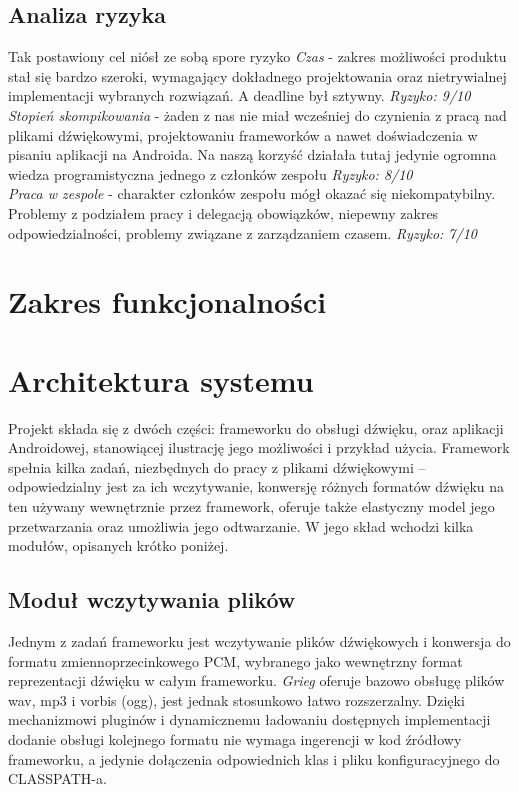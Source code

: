 \section{Analiza ryzyka}
Tak postawiony cel niósł ze sobą spore ryzyko
\emph{Czas} - zakres możliwości produktu stał się bardzo szeroki, wymagający dokładnego projektowania oraz nietrywialnej implementacji wybranych rozwiązań. A deadline był sztywny. \emph{Ryzyko: 9/10}
\\
\emph{Stopień skompikowania} - żaden z nas nie miał wcześniej do czynienia z pracą nad plikami dźwiękowymi, projektowaniu frameworków a nawet doświadczenia w pisaniu aplikacji na Androida. Na naszą korzyść działała tutaj jedynie ogromna wiedza programistyczna jednego z członków zespołu \emph{Ryzyko: 8/10}
\\
\emph{Praca w zespole} - charakter członków zespołu mógł okazać się niekompatybilny. Problemy z podziałem pracy i delegacją obowiązków, niepewny zakres odpowiedzialności, problemy związane z zarządzaniem czasem. \emph{Ryzyko: 7/10} 
 
\chapter{Zakres funkcjonalności}


\chapter{Architektura systemu}

Projekt składa się z dwóch części: frameworku do obsługi dźwięku, oraz aplikacji Androidowej,
stanowiącej ilustrację jego możliwości i przykład użycia. Framework spełnia kilka zadań, niezbędnych
do pracy z plikami dźwiękowymi -- odpowiedzialny jest za ich wczytywanie, konwersję różnych formatów
dźwięku na ten używany wewnętrznie przez framework, oferuje także elastyczny model jego
przetwarzania oraz umożliwia jego odtwarzanie. W jego skład wchodzi kilka modułów, opisanych krótko
poniżej.


\section{Moduł wczytywania plików}

Jednym z zadań frameworku jest wczytywanie plików dźwiękowych i konwersja do formatu
zmiennoprzecinkowego PCM, wybranego jako wewnętrzny format reprezentacji dźwięku w całym frameworku.
\emph{Grieg} oferuje bazowo obsługę plików wav, mp3 i vorbis (ogg), jest jednak stosunkowo łatwo
rozszerzalny. Dzięki mechanizmowi pluginów i dynamicznemu ładowaniu dostępnych implementacji dodanie
obsługi kolejnego formatu nie wymaga ingerencji w kod źródłowy frameworku, a jedynie dołączenia
odpowiednich klas i pliku konfiguracyjnego do CLASSPATH-a. 

